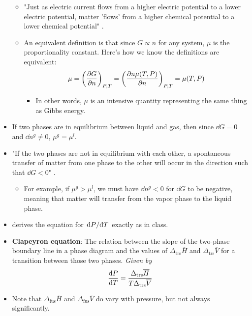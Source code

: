 \documentclass[../notes.tex]{subfiles}
\begin{document}
\begin{itemize}
\begin{itemize}
        \item "Just as electric current flows from a higher electric potential to a lower electric potential, matter 'flows' from a higher chemical potential to a lower chemical potential" \parencite[937]{bib:McQuarrieSimon}.
        \item An equivalent definition is that since $G\propto n$ for any system, $\mu$ is the proportionality constant. Here's how we know the definitions are equivalent:
        \begin{equation*}
            \mu = \left( \pdv{G}{n} \right)_{P,T}
            = \left( \pdv{n\mu(T,P)}{n} \right)_{P,T}
            = \mu(T,P)
        \end{equation*}
        \begin{itemize}
            \item In other words, $\mu$ is an intensive quantity representing the same thing as Gibbs energy.
        \end{itemize}
    \end{itemize}
    \item If two phases are in equilibrium between liquid and gas, then since $\dd{G}=0$ and $\dd{n^g}\neq 0$, $\mu^g=\mu^l$.
    \item "If the two phases are not in equilibrium with each other, a spontaneous transfer of matter from one phase to the other will occur in the direction such that $\dd{G}<0$" \parencite[937]{bib:McQuarrieSimon}.
    \begin{itemize}
        \item For example, if $\mu^g>\mu^l$, we must have $\dd{n^g}<0$ for $\dd{G}$ to be negative, meaning that matter will transfer from the vapor phase to the liquid phase.
    \end{itemize}
    \item \textcite{bib:McQuarrieSimon} derives the equation for $\dv*{P}{T}$ exactly as in class.
    \item \textbf{Clapeyron equation}: The relation between the slope of the two-phase boundary line in a phase diagram and the values of $\Delta_\text{trs}\overline{H}$ and $\Delta_\text{trs}\overline{V}$ for a transition between those two phases. \emph{Given by}
    \begin{equation*}
        \dv{P}{T} = \frac{\Delta_\text{trs}\overline{H}}{T\Delta_\text{trs}\overline{V}}
    \end{equation*}
    \item Note that $\Delta_\text{fus}\overline{H}$ and $\Delta_\text{fus}\overline{V}$ do vary with pressure, but not always significantly.

\end{itemize}
\end{document}
